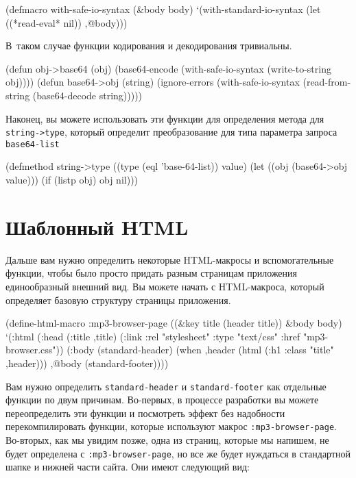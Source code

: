 \begin{myverb}
(defmacro with-safe-io-syntax (&body body)
  `(with-standard-io-syntax
     (let ((*read-eval* nil))
       ,@body)))
\end{myverb}

В~таком случае функции кодирования и декодирования тривиальны.

\begin{myverb}
(defun obj->base64 (obj)
  (base64-encode (with-safe-io-syntax (write-to-string obj))))
(defun base64->obj (string)
  (ignore-errors
    (with-safe-io-syntax (read-from-string (base64-decode string)))))
\end{myverb}

Наконец, вы можете использовать эти функции для определения метода для
\lstinline!string->type!, который определит преобразование для типа параметра запроса
\lstinline{base64-list}

\begin{myverb}
(defmethod string->type ((type (eql 'base-64-list)) value)
  (let ((obj (base64->obj value)))
    (if (listp obj) obj nil)))
\end{myverb}

\section{Шаблонный HTML}

Дальше вам нужно определить некоторые HTML-макросы и вспомогательные функции, чтобы было
просто придать разным страницам приложения единообразный внешний вид. Вы можете начать с
HTML-макроса, который определяет базовую структуру страницы приложения.

\begin{myverb}
(define-html-macro :mp3-browser-page ((&key title (header title)) &body body)
  `(:html
     (:head
      (:title ,title)
      (:link :rel "stylesheet" :type "text/css" :href "mp3-browser.css"))
     (:body
      (standard-header)
      (when ,header (html (:h1 :class "title" ,header)))
      ,@body
      (standard-footer))))
\end{myverb}

Вам нужно определить \lstinline{standard-header} и \lstinline{standard-footer} как отдельные функции
по двум причинам. Во-первых, в процессе разработки вы можете переопределить эти функции и
посмотреть эффект без надобности перекомпилировать функции, которые используют
макрос \lstinline{:mp3-browser-page}. Во-вторых, как мы увидим позже, одна из страниц, которые
мы напишем, не будет определена с \lstinline{:mp3-browser-page}, но все же будет нуждаться в
стандартной шапке и нижней части сайта. Они имеют следующий вид:


